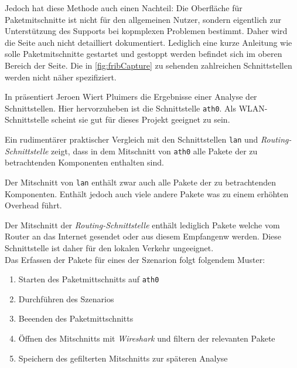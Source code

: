 Jedoch hat diese Methode auch einen Nachteil:
Die Oberfläche für Paketmitschnitte ist nicht für den allgemeinen Nutzer,
sondern eigentlich zur Unterstützung des Supports bei kopmplexen Problemen bestimmt.
Daher wird die Seite auch nicht detailliert dokumentiert.
Lediglich eine kurze Anleitung wie solle Paketmitschnitte gestartet und gestoppt werden befindet sich im oberen Bereich der Seite.
Die in \autoref{fig:fribCapture} zu sehenden zahlreichen Schnittstellen werden nicht näher spezifiziert.

In \cite{fritzcap8:online} präsentiert Jeroen Wiert Pluimers die Ergebnisse einer Analyse der Schnittstellen.
Hier hervorzuheben ist die Schnittstelle \texttt{ath0}. Als WLAN-Schnittstelle scheint sie gut für dieses Projekt geeignet zu sein.

Ein rudimentärer praktischer Vergleich mit den Schnittstellen \texttt{lan} und \textit{Routing-Schnittstelle} zeigt,
dass in dem Mitschnitt von \texttt{ath0} alle Pakete der zu betrachtenden Komponenten enthalten sind.

Der Mitschnitt von \texttt{lan} enthält zwar auch alle Pakete der zu betrachtenden Komponenten.
Enthält jedoch auch viele andere Pakete was zu einem erhöhten Overhead führt.

Der Mitschnitt der \textit{Routing-Schnittstelle} enthält lediglich Pakete welche vom Router an das Internet gesendet oder aus diesem Empfangenw werden.
Diese Schnittstelle ist daher für den lokalen Verkehr ungeeignet.\\

Das Erfassen der Pakete für eines der Szenarion folgt folgendem Muster:
\begin{enumerate}
    \setlength\itemsep{-0.5em}
    \item Starten des Paketmittschnitts auf \texttt{ath0}
    \item Durchführen des Szenarios
    \item Beeenden des Paketmittschnitts
    \item Öffnen des Mitschnitts mit \textit{Wireshark} und filtern der relevanten Pakete
    \item Speichern des gefilterten Mitschnitts zur späteren Analyse
\end{enumerate}